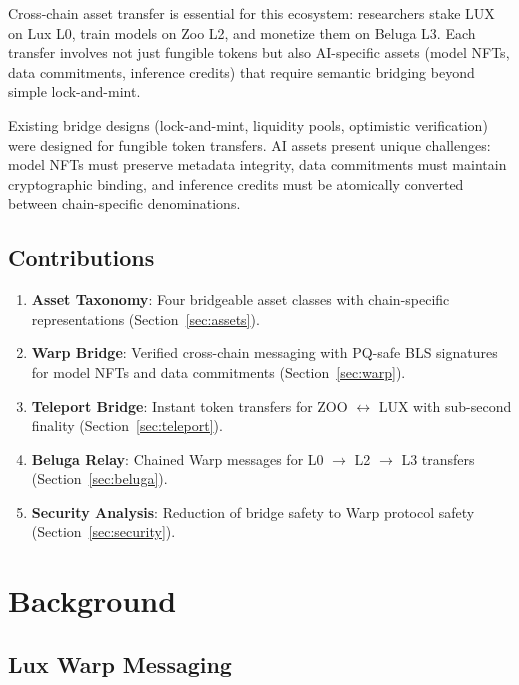 \documentclass[11pt,letterpaper]{article}
\begin{document}
Cross-chain asset transfer is essential for this ecosystem: researchers stake LUX on Lux L0, train models on Zoo L2, and monetize them on Beluga L3. Each transfer involves not just fungible tokens but also AI-specific assets (model NFTs, data commitments, inference credits) that require semantic bridging beyond simple lock-and-mint.

Existing bridge designs (lock-and-mint, liquidity pools, optimistic verification) were designed for fungible token transfers. AI assets present unique challenges: model NFTs must preserve metadata integrity, data commitments must maintain cryptographic binding, and inference credits must be atomically converted between chain-specific denominations.

\subsection{Contributions}

\begin{enumerate}
    \item \textbf{Asset Taxonomy}: Four bridgeable asset classes with chain-specific representations (Section~\ref{sec:assets}).

    \item \textbf{Warp Bridge}: Verified cross-chain messaging with PQ-safe BLS signatures for model NFTs and data commitments (Section~\ref{sec:warp}).

    \item \textbf{Teleport Bridge}: Instant token transfers for ZOO $\leftrightarrow$ LUX with sub-second finality (Section~\ref{sec:teleport}).

    \item \textbf{Beluga Relay}: Chained Warp messages for L0 $\to$ L2 $\to$ L3 transfers (Section~\ref{sec:beluga}).

    \item \textbf{Security Analysis}: Reduction of bridge safety to Warp protocol safety (Section~\ref{sec:security}).
\end{enumerate}

\section{Background}

\subsection{Lux Warp Messaging}
\end{document}
